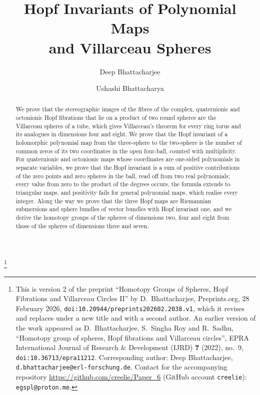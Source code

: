 \documentclass[11pt]{amsart}
\numberwithin{equation}{section}
\theoremstyle{plain}
\theoremstyle{definition}
\theoremstyle{remark}
\begin{document}
\title[Hopf invariants of polynomial maps and Villarceau spheres]{Hopf Invariants of Polynomial Maps\\ and Villarceau Spheres}

\author{Deep Bhattacharjee}
\address{Formerly, Electro-Gravitational Space Propulsion Laboratory (EGSPL), Bhubaneswar, Odisha 751030, India\\
Formerly, University of Calcutta (Heramba Chandra College), 23/49 Gariahat Road, Golpark, Kolkata 700029, West Bengal, India}

\author{Ushashi Bhattacharya}
\address{National Taiwan University, Taipei, Taiwan}

\thanks{This is version 2 of the preprint ``Homotopy Groups of Spheres, Hopf Fibrations and Villarceau Circles II'' by D.~Bhattacharjee, Preprints.org, 28 February 2026, \texttt{doi:10.20944/preprints202602.2038.v1}, which it revises and replaces under a new title and with a second author. An earlier version of the work appeared as D.~Bhattacharjee, S.~Singha Roy and R.~Sadhu, ``Homotopy group of spheres, Hopf fibrations and Villarceau circles'', EPRA International Journal of Research \& Development (IJRD) \textbf{7} (2022), no.~9, \texttt{doi:10.36713/epra11212}. Corresponding author: Deep Bhattacharjee, \texttt{d.bhattacharjee@erl-forschung.de}. Contact for the accompanying repository \url{https://github.com/creelie/Paper_6} (GitHub account \texttt{creelie}): \texttt{egspl@proton.me}.}

\date{}

\begin{abstract}
We prove that the stereographic images of the fibres of the complex, quaternionic and octonionic Hopf fibrations that lie on a product of two round spheres are the Villarceau spheres of a tube, which gives Villarceau's theorem for every ring torus and its analogues in dimensions four and eight. We prove that the Hopf invariant of a holomorphic polynomial map from the three-sphere to the two-sphere is the number of common zeros of its two coordinates in the open four-ball, counted with multiplicity. For quaternionic and octonionic maps whose coordinates are one-sided polynomials in separate variables, we prove that the Hopf invariant is a sum of positive contributions of the zero points and zero spheres in the ball, read off from two real polynomials; every value from zero to the product of the degrees occurs, the formula extends to triangular maps, and positivity fails for general polynomial maps, which realise every integer. Along the way we prove that the three Hopf maps are Riemannian submersions and sphere bundles of vector bundles with Hopf invariant one, and we derive the homotopy groups of the spheres of dimensions two, four and eight from those of the spheres of dimensions three and seven.
\end{abstract}
\end{document}

